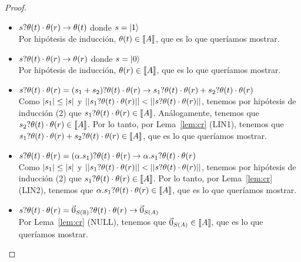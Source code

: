 \begin{proof}
\begin{itemize}
\begin{itemize}
      \item \( s? \theta(t) \cdot \theta(r) \rightarrow \theta(t) \) donde \( s = \ket{1} \)
        \\ Por hipótesis de inducción, \( \theta(t) \in \llbracket A\rrbracket \), que es lo que queríamos mostrar.
      \item \( s? \theta(t) \cdot \theta(r) \rightarrow \theta(r) \) donde \( s = \ket{0} \)
        \\ Por hipótesis de inducción, \( \theta(r) \in \llbracket A\rrbracket \), que es lo que queríamos mostrar.
      \item \( s? \theta(t) \cdot \theta(r) = (s_1 + s_2)? \theta(t) \cdot \theta(r) \rightarrow s_1? \theta(t) \cdot \theta(r) + s_2? \theta(t) \cdot \theta(r) \)
        \\ Como \( |s_1| \leq |s| \) y \( ||s_1? \theta(t) \cdot \theta(r)|| < ||s? \theta(t) \cdot \theta(r)|| \), tenemos por hipótesis de inducción (2) que \( s_1? \theta(t) \cdot \theta(r) \in \llbracket A\rrbracket \). Análogamente, tenemos que \( s_2? \theta(t) \cdot \theta(r) \in \llbracket A\rrbracket \). Por lo tanto, por Lema~\ref{lem:cr} (LIN1), tenemos que \( s_1? \theta(t) \cdot \theta(r) + s_2? \theta(t) \cdot \theta(r) \in \llbracket A\rrbracket \), que es lo que queríamos mostrar.
      \item \( s? \theta(t) \cdot \theta(r) = (\alpha . s_1)? \theta(t) \cdot \theta(r) \rightarrow \alpha . s_1? \theta(t) \cdot \theta(r) \)
        \\ Como \( |s_1| \leq |s| \) y \( ||s_1? \theta(t) \cdot \theta(r)|| < ||s? \theta(t) \cdot \theta(r)|| \), tenemos por hipótesis de inducción (2) que \( s_1? \theta(t) \cdot \theta(r) \in \llbracket A\rrbracket \). Por lo tanto, por Lema~\ref{lem:cr} (LIN2), tenemos que \( \alpha . s_1? \theta(t) \cdot \theta(r) \in \llbracket A\rrbracket \), que es lo que queríamos mostrar.
      \item \( s? \theta(t) \cdot \theta(r) = \vec{0}_{S (\mathbb{B})}? \theta(t) \cdot \theta(r) \rightarrow \vec{0}_{S (A)} \)
        \\ Por Lema~\ref{lem:cr} (NULL), tenemos que \( \vec{0}_{S (A)} \in \llbracket A\rrbracket \), que es lo que queríamos mostrar.
    \end{itemize}


\end{itemize}
\end{proof}
